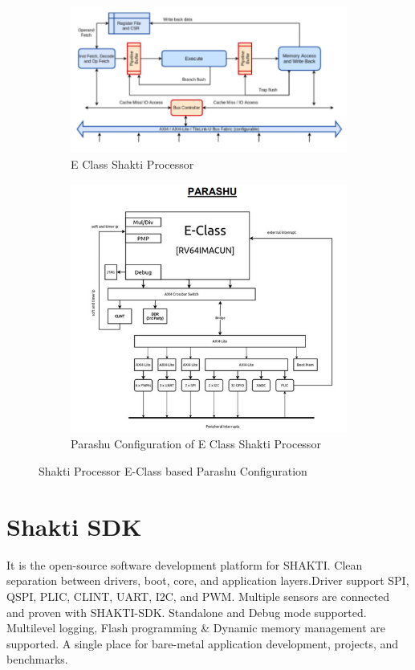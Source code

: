 \begin{figure}
      \begin{subfigure}{.5\textwidth}
        \centering
        \includegraphics[width=.8\linewidth]{./FPGA_Implementation/Eclass.png}
        \caption{E Class Shakti Processor}
        \end{subfigure}%
        \begin{subfigure}{.5\textwidth}
        \centering
        \includegraphics[width=.8\linewidth]{./FPGA_Implementation/parashu.png}
        \caption{Parashu Configuration of E Class Shakti Processor}
        \end{subfigure}
        \caption{Shakti Processor E-Class based Parashu Configuration}
\end{figure}

\section{Shakti SDK}

It is the open-source software development platform for SHAKTI. Clean separation between drivers, boot, core, and application layers.Driver support SPI, QSPI, PLIC, CLINT, UART, I2C, and PWM. Multiple sensors are connected and proven with SHAKTI-SDK. Standalone and Debug mode supported. Multilevel logging, Flash programming \& Dynamic memory management are supported. A single place for bare-metal application development, projects, and benchmarks.

